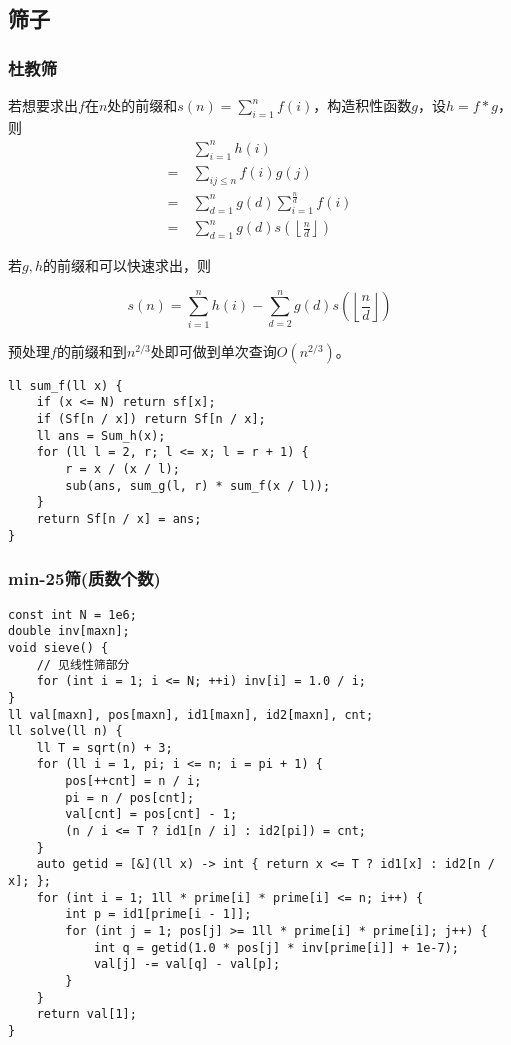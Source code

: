\documentclass[twoside]{article}
\begin{document}
\subsection{筛子}
\subsubsection{杜教筛}
若想要求出$f$在$n$处的前缀和$s(n) = \sum\limits_{i=1}^n f(i)$，构造积性函数$g$，设$h =  f \ast g$，则
$$
\begin{aligned}
& \sum\limits_{i = 1} ^ n h(i) \\
= \ & \sum\limits_{ij \leq n} f(i) g(j) \\
= \ & \sum\limits_{d = 1} ^ n g(d) \sum\limits_{i = 1} ^ {\frac n d} f(i) \\ 
= \ & \sum\limits_{d = 1} ^ n g(d) s\left(\left\lfloor\frac n d\right\rfloor\right)
\end{aligned}
$$

若$g,h$的前缀和可以快速求出，则

$$
s(n) = \sum\limits_{i = 1} ^ n h(i) - \sum\limits_{d = 2} ^ n g(d)s\left(\left\lfloor\frac n d\right\rfloor\right)
$$

预处理$f$的前缀和到$n^{2/3}$处即可做到单次查询$O(n^{2/3})$。

\begin{lstlisting}
ll sum_f(ll x) {
	if (x <= N) return sf[x];
	if (Sf[n / x]) return Sf[n / x];
	ll ans = Sum_h(x);
	for (ll l = 2, r; l <= x; l = r + 1) {
		r = x / (x / l);
		sub(ans, sum_g(l, r) * sum_f(x / l));
	}
	return Sf[n / x] = ans;
}
\end{lstlisting}
\subsubsection{min-25筛(质数个数)}
\begin{lstlisting}
const int N = 1e6;
double inv[maxn];
void sieve() {
	// 见线性筛部分
	for (int i = 1; i <= N; ++i) inv[i] = 1.0 / i;
}
ll val[maxn], pos[maxn], id1[maxn], id2[maxn], cnt;
ll solve(ll n) {
	ll T = sqrt(n) + 3;
	for (ll i = 1, pi; i <= n; i = pi + 1) {
		pos[++cnt] = n / i;
		pi = n / pos[cnt];
		val[cnt] = pos[cnt] - 1;
		(n / i <= T ? id1[n / i] : id2[pi]) = cnt;
	}
	auto getid = [&](ll x) -> int { return x <= T ? id1[x] : id2[n / x]; };
	for (int i = 1; 1ll * prime[i] * prime[i] <= n; i++) {
		int p = id1[prime[i - 1]];
		for (int j = 1; pos[j] >= 1ll * prime[i] * prime[i]; j++) {
			int q = getid(1.0 * pos[j] * inv[prime[i]] + 1e-7);
			val[j] -= val[q] - val[p];
		}
	}
	return val[1];
}\end{lstlisting}
\end{document}
